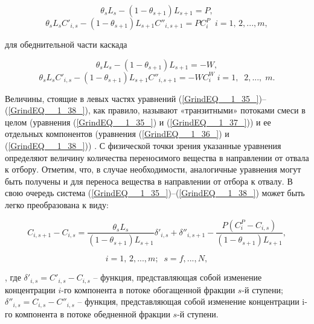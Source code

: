 \begin{equation} \label{GrindEQ__1_35_} 
  \theta _{s} L_{s} -(1-\theta _{s+1} )L_{s+1} =P, 
  \end{equation} 
  \begin{equation} \label{GrindEQ__1_36_} 
  \theta _{s} L_{s} C'_{i,s} -(1-\theta _{s+1} )L_{s+1} C''_{i,s+1} =PC_{i}^{P} \; \; i=1,\, 2,...,m,        
  \end{equation} 

для обеднительной части каскада

\begin{equation} \label{GrindEQ__1_37_} 
  \theta _{s} L_{s} -(1-\theta _{s+1} )L_{s+1} =-W, 
  \end{equation} 
  \begin{equation} \label{GrindEQ__1_38_} 
  \theta _{s} L_{s} C'_{i,s} -(1-\theta _{s+1} )L_{s+1} C''_{i,s+1} =-WC_{i}^{W} \; i=1,\; \; 2,...,\; m.        
  \end{equation} 

Величины, стоящие в левых частях уравнений (\ref{GrindEQ__1_35_})--(\ref{GrindEQ__1_38_}), как правило, называют «транзитными» потоками смеси в целом (уравнения (\ref{GrindEQ__1_35_}) и (\ref{GrindEQ__1_37_})) и ее отдельных компонентов (уравнения (\ref{GrindEQ__1_36_}) и (\ref{GrindEQ__1_38_})) \cite{sulaberidzeTeoriyaKaskadovDlya2011}. С физической точки зрения указанные уравнения определяют величину количества переносимого вещества в направлении от отвала к отбору. Отметим, что, в случае необходимости, аналогичные уравнения могут быть получены и для переноса вещества в направлении от отбора к отвалу. 
В свою очередь система (\ref{GrindEQ__1_35_})--(\ref{GrindEQ__1_38_}) может быть легко преобразована к виду:

\begin{equation} \label{GrindEQ__1_39_} 
  C_{i,s+1} -C_{i,s} =\frac{\theta _{s} L_{s} }{(1-\theta _{s+1} )L_{s+1} } \delta '_{i,s} +\delta ''_{i,s+1} -\frac{P\left(C_{i}^{P} -C_{i,s} \right)}{(1-\theta _{s+1} )L_{s+1} } ,        
  \end{equation} 

\[i=1,\, 2,...,m;\; \; s=f,...,N,\] 

, где $\delta '_{i,s} =C'_{i,s} -C_{i,s} $ -- функция, представляющая собой изменение концентрации $i$-го компонента в потоке обогащенной фракции $s$-й ступени; $\delta ''_{i,s} =C_{i,s} -C''_{i,s} $ – функция, представляющая собой изменение концентрации i-го компонента в потоке обедненной фракции $s$-й ступени.

